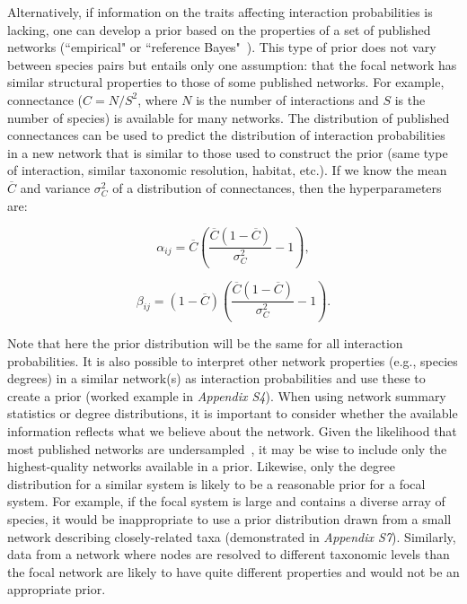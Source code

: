 \documentclass[12pt]{article}
\begin{document}
\begin{spacing}{1.5}
        Alternatively, if information on the traits affecting interaction probabilities is lacking, one can develop a prior based on the properties of a set of published networks (``empirical" or ``reference Bayes"~\citet{Spiegelhalter2000}). This type of prior does not vary between species pairs but entails only one assumption: that the focal network has similar structural properties to those of some published networks. For example, connectance ($C=N/S^2$, where $N$ is the number of interactions and $S$ is the number of species) is available for many networks. The distribution of published connectances can be used to predict the distribution of interaction probabilities in a new network that is similar to those used to construct the prior (same type of interaction, similar taxonomic resolution, habitat, etc.). If we know the mean $\overline{C}$ and variance $\sigma_C^2$ of a distribution of connectances, then the hyperparameters are:

        \begin{equation}
        \alpha_{ij}=\overline{C}(\frac{\overline{C}(1-\overline{C})}{\sigma_C^2}-1) ,
        \end{equation}

        \begin{equation}
        \beta_{ij}=(1-\overline{C})(\frac{\overline{C}(1-\overline{C})}{\sigma_C^2}-1) .
        \end{equation}
  

        Note that here the prior distribution will be the same for all interaction probabilities. It is also possible to interpret other network properties (e.g., species degrees) in a similar network(s) as interaction probabilities and use these to create a prior (worked example in \emph{Appendix S4}). When using network summary statistics or degree distributions, it is important to consider whether the available information reflects what we believe about the network. Given the likelihood that most published networks are undersampled~\citep{Jordano2016}, it may be wise to include only the highest-quality networks available in a prior. Likewise, only the degree distribution for a similar system is likely to be a reasonable prior for a focal system. For example, if the focal system is large and contains a diverse array of species, it would be inappropriate to use a prior distribution drawn from a small network describing closely-related taxa (demonstrated in \emph{Appendix S7}). Similarly, data from a network where nodes are resolved to different taxonomic levels than the focal network are likely to have quite different properties and would not be an appropriate prior.



\end{spacing}
\end{document}
